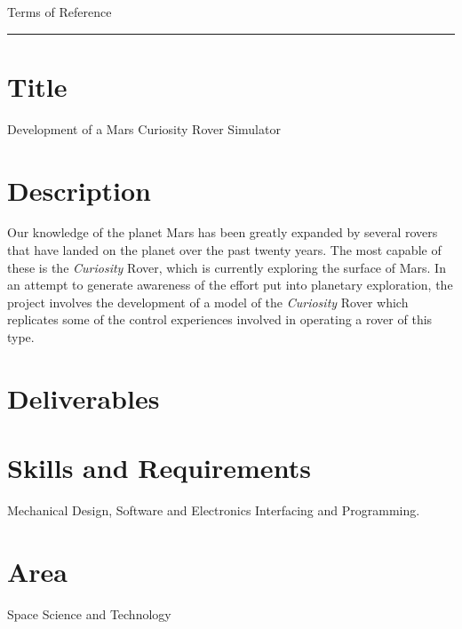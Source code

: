 {\Large Terms of Reference}\\
\hrule

\section*{Title}
  Development of a Mars Curiosity Rover Simulator
\section*{Description}
  Our knowledge of the planet Mars has been greatly expanded by several rovers that have landed on the planet over the past twenty years. The most capable of these is the \textit{Curiosity} Rover, which is currently exploring the surface of Mars. In an attempt to generate awareness of the effort put into planetary exploration, the project involves the development of a model of the \textit{Curiosity} Rover which replicates some of the control experiences involved in operating a rover of this type.
  
\section*{Deliverables}
  
\section*{Skills and Requirements}
  Mechanical Design, Software and Electronics Interfacing and Programming.
  
\section*{Area}
  Space Science and Technology
